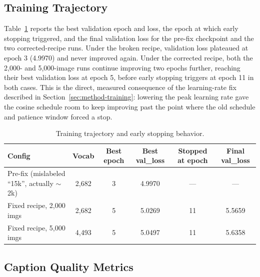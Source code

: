 \documentclass[conference]{IEEEtran}
\begin{document}
\subsection{Training Trajectory}
\label{sec:results-trajectory}
Table~\ref{tab:training-trajectory} reports the best validation epoch and loss, the epoch at which early stopping triggered, and the final validation loss for the pre-fix checkpoint and the two corrected-recipe runs. Under the broken recipe, validation loss plateaued at epoch 3 (4.9970) and never improved again. Under the corrected recipe, both the 2,000- and 5,000-image runs continue improving two epochs further, reaching their best validation loss at epoch 5, before early stopping triggers at epoch 11 in both cases. This is the direct, measured consequence of the learning-rate fix described in Section~\ref{sec:method-training}: lowering the peak learning rate gave the cosine schedule room to keep improving past the point where the old schedule and patience window forced a stop.

\begin{table}[t]
\centering
\caption{Training trajectory and early stopping behavior.}
\label{tab:training-trajectory}
\small
\renewcommand{\arraystretch}{1.12}
\begin{tabular}{@{}p{}ccccc@{}}
\toprule
\textbf{Config} & \textbf{Vocab} & \textbf{Best epoch} & \textbf{Best val\_loss} & \textbf{Stopped at epoch} & \textbf{Final val\_loss} \\
\midrule
Pre-fix (mislabeled ``15k'', actually $\sim$2k) & 2,682 & 3 & 4.9970 & --- & --- \\
Fixed recipe, 2,000 imgs & 2,682 & 5 & 5.0269 & 11 & 5.5659 \\
Fixed recipe, 5,000 imgs & 4,493 & 5 & 5.0497 & 11 & 5.6358 \\
\bottomrule
\end{tabular}
\end{table}

\subsection{Caption Quality Metrics}
\label{sec:results-metrics}
\end{document}
